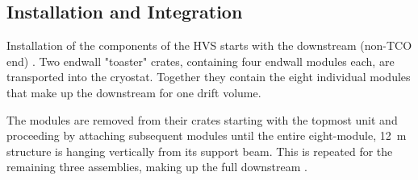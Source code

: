 
\subsection{Installation and Integration}
\label{sec:fdsp-hv-transport-install}
Installation of the components of the HVS starts with the downstream (non-TCO end) .  Two endwall "toaster" crates,  
containing four endwall modules each, are transported into the cryostat.  Together they contain the eight individual modules that make up the  
downstream  for one drift volume. %

The modules are removed from their crates starting with the topmost unit and proceeding by attaching subsequent modules until the entire eight-module, \SI{12}{m} structure
is hanging vertically from its support beam.  This is repeated for the remaining three assemblies, making up the full downstream . %

